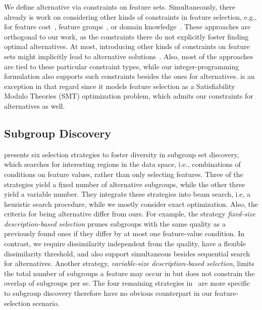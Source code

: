 \documentclass{article}
\theoremstyle{definition}
\begin{document}
We define alternative via constraints on feature sets.
Simultaneously, there already is work on considering other kinds of constraints in feature selection, e.g., for feature cost~\cite{paclik2002feature}, feature groups~\cite{yuan2006model}, or domain knowledge~\cite{bach2022empirical, groves2015toward}.
These approaches are orthogonal to our work, as the constraints there do not explicitly foster finding optimal alternatives.
At most, introducing other kinds of constraints on feature sets might implicitly lead to alternative solutions~\cite{bach2022empirical}.
Also, most of the approaches are tied to these particular constraint types, while our integer-programming formulation also supports such constraints besides the ones for alternatives.
\cite{bach2022empirical} is an exception in that regard since it models feature selection as a Satisfiability Modulo Theories (\textsc{SMT}) optimization problem, which admits our constraints for alternatives as well.

\subsection{Subgroup Discovery}
\label{sec:afs:related-work:subgroup-discovery}

\cite{leeuwen2012diverse} presents six selection strategies to foster diversity in subgroup set discovery, which searches for interesting regions in the data space, i.e., combinations of conditions on feature values, rather than only selecting features.
Three of the strategies yield a fixed number of alternative subgroups, while the other three yield a variable number.
They integrate these strategies into beam search, i.e, a heuristic search procedure, while we mostly consider exact optimization.
Also, the criteria for being alternative differ from ours.
For example, the strategy \emph{fixed-size description-based selection} prunes subgroups with the same quality as a previously found ones if they differ by at most one feature-value condition.
In contrast, we require dissimilarity independent from the quality, have a flexible dissimilarity threshold, and also support simultaneous besides sequential search for alternatives.
Another strategy, \emph{variable-size description-based selection}, limits the total number of subgroups a feature may occur in but does not constrain the overlap of subgroups per se.
The four remaining strategies in~\cite{leeuwen2012diverse} are more specific to subgroup discovery therefore have no obvious counterpart in our feature-selection scenario.
\end{document}
